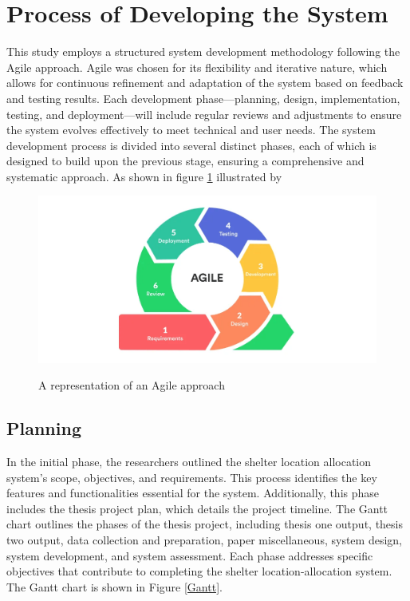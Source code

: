 \section{Process of Developing the System}
	This study employs a structured system development methodology following the Agile approach. Agile was chosen for its flexibility and iterative nature, which allows for continuous refinement and adaptation of the system based on feedback and testing results. Each development phase—planning, design, implementation, testing, and deployment—will include regular reviews and adjustments to ensure the system evolves effectively to meet technical and user needs.
	The system development process is divided into several distinct phases, each of which is designed to build upon the previous stage, ensuring a comprehensive and systematic approach. As shown in figure \ref{Agile} illustrated by \textcite{Jayathilaka2020}

	\begin{figure}[h!]
		\caption{A representation of an Agile approach}
		\centering
		\includegraphics[width=\textwidth]{AGILE}
		\label{Agile}
	\end{figure}

\subsection{Planning}

	In the initial phase, the researchers outlined the shelter location allocation system's scope, objectives, and requirements. This process identifies the key features and functionalities essential for the system. Additionally, this phase includes the thesis project plan, which details the project timeline.
	The Gantt chart outlines the phases of the thesis project, including thesis one output, thesis two output, data collection and preparation, paper miscellaneous, system design, system development, and system assessment. Each phase addresses specific objectives that contribute to completing the shelter location-allocation system. The Gantt chart is shown in Figure \ref{Gantt}.
	
